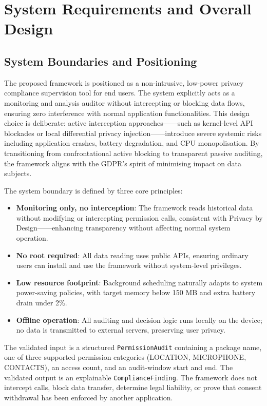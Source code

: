 \newpage
\section{System Requirements and Overall Design}

\subsection{System Boundaries and Positioning}

The proposed framework is positioned as a non-intrusive, low-power privacy compliance supervision tool for end users. The system explicitly acts as a monitoring and analysis auditor without intercepting or blocking data flows, ensuring zero interference with normal application functionalities. This design choice is deliberate: active interception approaches——such as kernel-level API blockades or local differential privacy injection——introduce severe systemic risks including application crashes, battery degradation, and CPU monopolisation. By transitioning from confrontational active blocking to transparent passive auditing, the framework aligns with the GDPR's spirit of minimising impact on data subjects.

The system boundary is defined by three core principles:

\begin{itemize}
\item \textbf{Monitoring only, no interception}: The framework reads historical data without modifying or intercepting permission calls, consistent with Privacy by Design——enhancing transparency without affecting normal system operation.
\item \textbf{No root required}: All data reading uses public APIs, ensuring ordinary users can install and use the framework without system-level privileges.
\item \textbf{Low resource footprint}: Background scheduling naturally adapts to system power-saving policies, with target memory below 150 MB and extra battery drain under 2\%.
\item \textbf{Offline operation}: All auditing and decision logic runs locally on the device; no data is transmitted to external servers, preserving user privacy.
\end{itemize}

The validated input is a structured \texttt{PermissionAudit} containing a package name, one of three supported permission categories (LOCATION, MICROPHONE, CONTACTS), an access count, and an audit-window start and end. The validated output is an explainable \texttt{ComplianceFinding}. The framework does not intercept calls, block data transfer, determine legal liability, or prove that consent withdrawal has been enforced by another application.

